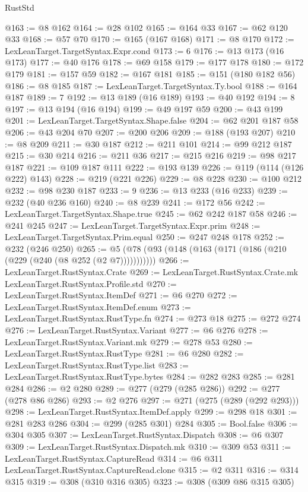 \begin{lexlean}{RustStd}
\begin{coremodule}
@163 := @8 @162
@164 := @28 @102
@165 := @164 @33
@167 := @62 @120 @33
@168 := @57 @70
@170 := @165 (@167 @168)
@171 := @8 @170
@172 := LexLeanTarget.TargetSyntax.Expr.cond
@173 := 6
@176 := @13 @173 (@16 @173)
@177 := @40 @176
@178 := @69 @158
@179 := @177 @178
@180 := @172 @179
@181 := @157 @59
@182 := @167 @181
@185 := @151 (@180 @182 @56)
@186 := @8 @185
@187 := LexLeanTarget.TargetSyntax.Ty.bool
@188 := @164 @187
@189 := 7
@192 := @13 @189 (@16 @189)
@193 := @40 @192
@194 := 8
@197 := @13 @194 (@16 @194)
@199 := @49 @197 @59
@200 := @43 @199
@201 := LexLeanTarget.TargetSyntax.Shape.false
@204 := @62 @201 @187 @58
@206 := @43 @204 @70
@207 := @200 @206
@209 := @188 (@193 @207)
@210 := @8 @209
@211 := @30 @187
@212 := @211 @101
@214 := @99 @212 @187
@215 := @30 @214
@216 := @211 @36
@217 := @215 @216
@219 := @98 @217 @187
@221 := @109 @187 @111
@222 := @193 @139
@226 := @119 (@114 (@126 @222) @143)
@228 := @219 (@221 @226)
@229 := @8 @228
@230 := @100 @212
@232 := @98 @230 @187
@233 := 9
@236 := @13 @233 (@16 @233)
@239 := @232 (@40 @236 @160)
@240 := @8 @239
@241 := @172 @56
@242 := LexLeanTarget.TargetSyntax.Shape.true
@245 := @62 @242 @187 @58
@246 := @241 @245
@247 := LexLeanTarget.TargetSyntax.Expr.prim
@248 := LexLeanTarget.TargetSyntax.Prim.equal
@250 := @247 @248 @178
@252 := @232 (@246 @250)
@265 := @5 (@78 (@93 (@148 (@163 (@171 (@186 (@210 (@229 (@240 (@8 @252 (@2 @7)))))))))))
@266 := LexLeanTarget.RustSyntax.Crate
@269 := LexLeanTarget.RustSyntax.Crate.mk LexLeanTarget.RustSyntax.Profile.std
@270 := LexLeanTarget.RustSyntax.ItemDef
@271 := @6 @270
@272 := LexLeanTarget.RustSyntax.ItemDef.enum
@273 := LexLeanTarget.RustSyntax.RustType.fn
@274 := @273 @18
@275 := @272 @274
@276 := LexLeanTarget.RustSyntax.Variant
@277 := @6 @276
@278 := LexLeanTarget.RustSyntax.Variant.mk
@279 := @278 @53
@280 := LexLeanTarget.RustSyntax.RustType
@281 := @6 @280
@282 := LexLeanTarget.RustSyntax.RustType.list
@283 := LexLeanTarget.RustSyntax.RustType.bytes
@284 := @282 @283
@285 := @281 @284
@286 := @2 @280
@289 := @277 (@279 (@285 @286))
@292 := @277 (@278 @86 @286)
@293 := @2 @276
@297 := @271 (@275 (@289 (@292 @293)))
@298 := LexLeanTarget.RustSyntax.ItemDef.apply
@299 := @298 @18
@301 := @281 @283 @286
@304 := @299 (@285 @301) @284
@305 := Bool.false
@306 := @304 @305
@307 := LexLeanTarget.RustSyntax.Dispatch
@308 := @6 @307
@309 := LexLeanTarget.RustSyntax.Dispatch.mk
@310 := @309 @53
@311 := LexLeanTarget.RustSyntax.CaptureRead
@314 := @6 @311 LexLeanTarget.RustSyntax.CaptureRead.clone
@315 := @2 @311
@316 := @314 @315
@319 := @308 (@310 @316 @305)
@323 := @308 (@309 @86 @315 @305)

\end{coremodule}
\end{lexlean}
